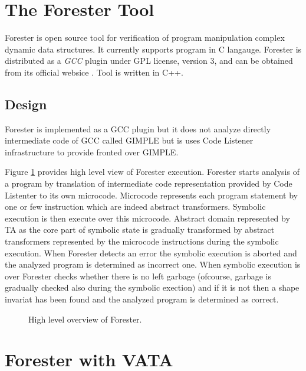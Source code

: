 

\section{The Forester Tool}
\label{sec:FA}

Forester is open source tool for verification of program manipulation complex dynamic data structures.
It currently supports program in C langauge.
Forester is distributed as a \emph{GCC} plugin under GPL license, version 3, and can be obtained from its official websice \cite{www.:forester}.
Tool is written in C++.

\subsection{Design}

Forester is implemented as a GCC plugin but it does not analyze directly intermediate code of GCC called GIMPLE but is
uses Code Listener infrastructure \cite{codelistnere} to provide fronted over GIMPLE.

Figure \ref{fig:fa_exec} provides high level view of Forester execution. 
Forester starts analysis of a program by translation of intermediate code representation provided by Code Listenter
to its own microcode.
Microcode represents each program statement by one or few instruction which are indeed abstract transformers.
Symbolic execution is then execute over this microcode.
Abstract domain represented by TA as the core part of symbolic state is gradually transformed by abstract transformers
represented by the microcode instructions during the symbolic execution.
When Forester detects an error the symbolic execution is aborted and the analyzed program is determined as incorrect one.
When symbolic execution is over Forester checks whether there is no left garbage (ofcourse, garbage is gradually checked also during the symbolic exection)
and if it is not then a shape invariat has been found and the analyzed program is determined as correct.

\begin{figure}[bt]
	\begin{center}
		
	\end{center}
	\caption{High level overview of Forester.}
	\label{fig:fa_exec}
\end{figure}

\section{Forester with VATA}
\label{sec:fova}

